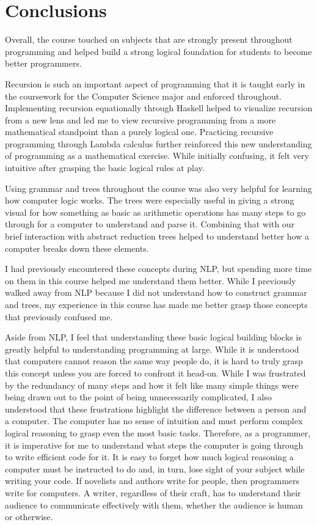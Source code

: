 \documentclass{article}
\theoremstyle{theorem}
\theoremstyle{definition}
\theoremstyle{remark}
\begin{document}
\section{Conclusions}\label{conclusions}
Overall, the course touched on subjects that are strongly present throughout programming and helped build a strong logical foundation for students to become better programmers.

\medskip\noindent
Recursion is such an important aspect of programming that it is taught early in the coursework for the Computer Science major and enforced throughout. Implementing recursion equationally through Haskell helped to visualize recursion from a new lens and led me to view recursive programming from a more mathematical standpoint than a purely logical one. Practicing recursive programming through Lambda calculus further reinforced this new understanding of programming as a mathematical exercise. While initially confusing, it felt very intuitive after grasping the basic logical rules at play.

\medskip\noindent
Using grammar and trees throughout the course was also very helpful for learning how computer logic works. The trees were especially useful in giving a strong visual for how something as basic as arithmetic operations has many steps to go through for a computer to understand and parse it. Combining that with our brief interaction with abstract reduction trees helped to understand better how a computer breaks down these elements.

\medskip\noindent
I had previously encountered these concepts during NLP, but spending more time on them in this course helped me understand them better. While I previously walked away from NLP because I did not understand how to construct grammar and trees, my experience in this course has made me better grasp those concepts that previously confused me.

\medskip\noindent
Aside from NLP, I feel that understanding these basic logical building blocks is greatly helpful to understanding programming at large. While it is understood that computers cannot reason the same way people do, it is hard to truly grasp this concept unless you are forced to confront it head-on. While I was frustrated by the redundancy of many steps and how it felt like many simple things were being drawn out to the point of being unnecessarily complicated, I also understood that these frustrations highlight the difference between a person and a computer. The computer has no sense of intuition and must perform complex logical reasoning to grasp even the most basic tasks. Therefore, as a programmer, it is imperative for me to understand what steps the computer is going through to write efficient code for it. It is easy to forget how much logical reasoning a computer must be instructed to do and, in turn, lose sight of your subject while writing your code. If novelists and authors write for people, then programmers write for computers. A writer, regardless of their craft, has to understand their audience to communicate effectively with them, whether the audience is human or otherwise.
\end{document}
